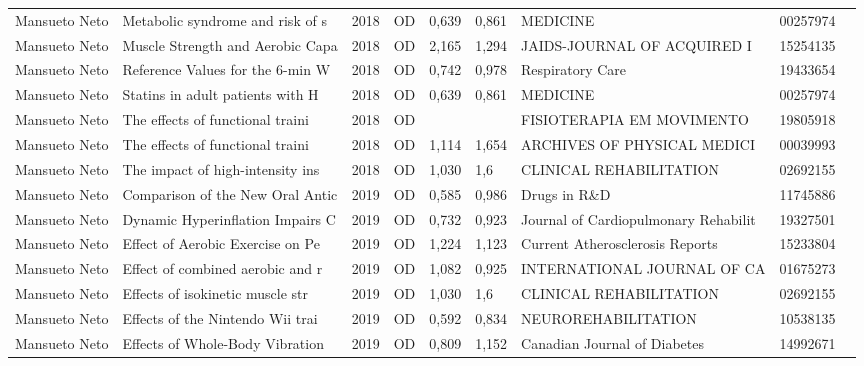 \documentclass[12pt,brazil]{article}\usepackage[]{graphicx}\usepackage[]{xcolor}
\begin{document}
\begin{longtable}{lllrrllrr}
Mansueto Neto & Metabolic syndrome and risk of s & 2018 & OD & 0,639 & 0,861 & MEDICINE & 00257974 \\
Mansueto Neto & Muscle Strength and Aerobic Capa & 2018 & OD & 2,165 & 1,294 & JAIDS-JOURNAL OF ACQUIRED I & 15254135 \\
Mansueto Neto & Reference Values for the 6-min W & 2018 & OD & 0,742 & 0,978 & Respiratory Care & 19433654 \\
Mansueto Neto & Statins in adult patients with H & 2018 & OD & 0,639 & 0,861 & MEDICINE & 00257974 \\
Mansueto Neto & The effects of functional traini & 2018 & OD &  &  & FISIOTERAPIA EM MOVIMENTO & 19805918 \\
\rowcolor{duplic}\rowcolor{duplic}\rowcolor{duplic}\rowcolor{duplic}\rowcolor{duplic}\rowcolor{duplic}\rowcolor{duplic}\rowcolor{duplic}\rowcolor{duplic}\rowcolor{duplic}\rowcolor{duplic}\rowcolor{duplic}\rowcolor{duplic}\rowcolor{duplic}\rowcolor{duplic}\rowcolor{duplic}Mansueto Neto & The effects of functional traini & 2018 & OD & 1,114 & 1,654 & ARCHIVES OF PHYSICAL MEDICI & 00039993 \\
Mansueto Neto & The impact of high-intensity ins & 2018 & OD & 1,030 & 1,6 & CLINICAL REHABILITATION & 02692155 \\
Mansueto Neto & Comparison of the New Oral Antic & 2019 & OD & 0,585 & 0,986 & Drugs in R\&D & 11745886 \\
Mansueto Neto & Dynamic Hyperinflation Impairs C & 2019 & OD & 0,732 & 0,923 & Journal of Cardiopulmonary Rehabilit & 19327501 \\
Mansueto Neto & Effect of Aerobic Exercise on Pe & 2019 & OD & 1,224 & 1,123 & Current Atherosclerosis Reports & 15233804 \\
Mansueto Neto & Effect of combined aerobic and r & 2019 & OD & 1,082 & 0,925 & INTERNATIONAL JOURNAL OF CA & 01675273 \\
Mansueto Neto & Effects of isokinetic muscle str & 2019 & OD & 1,030 & 1,6 & CLINICAL REHABILITATION & 02692155 \\
Mansueto Neto & Effects of the Nintendo Wii trai & 2019 & OD & 0,592 & 0,834 & NEUROREHABILITATION & 10538135 \\
\rowcolor{duplic}\rowcolor{duplic}\rowcolor{duplic}\rowcolor{duplic}\rowcolor{duplic}\rowcolor{duplic}\rowcolor{duplic}\rowcolor{duplic}\rowcolor{duplic}\rowcolor{duplic}\rowcolor{duplic}\rowcolor{duplic}\rowcolor{duplic}\rowcolor{duplic}\rowcolor{duplic}\rowcolor{duplic}Mansueto Neto & Effects of Whole-Body Vibration  & 2019 & OD & 0,809 & 1,152 & Canadian Journal of Diabetes & 14992671 \\

\end{longtable}
\end{document}
